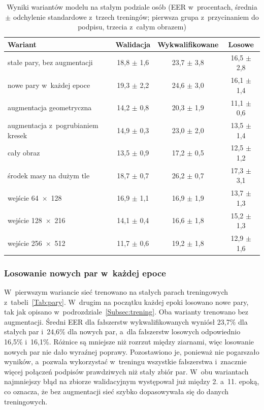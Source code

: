 \documentclass[12pt, twoside, openright]{article}
\begin{document}
\begin{table}[ht]
\caption{Wyniki wariantów modelu na stałym podziale osób (EER w~procentach, średnia $\pm$ odchylenie standardowe z~trzech treningów; pierwsza grupa z~przycinaniem do podpisu, trzecia z~całym obrazem)}
\centering
	\begin{tabular}{|l|c|c|c|}
		\hline
		Wariant & Walidacja & Wykwalifikowane & Losowe \\
		\hline
		stałe pary, bez augmentacji & 18,8 $\pm$ 1,6 & 23,7 $\pm$ 3,8 & 16,5 $\pm$ 2,8 \\
		nowe pary w~każdej epoce & 19,3 $\pm$ 2,2 & 24,6 $\pm$ 3,0 & 16,1 $\pm$ 1,4 \\
		augmentacja geometryczna & 14,2 $\pm$ 0,8 & 20,3 $\pm$ 1,9 & 11,1 $\pm$ 0,6 \\
		augmentacja z~pogrubianiem kresek & 14,9 $\pm$ 0,3 & 23,0 $\pm$ 2,0 & 13,5 $\pm$ 1,4 \\
		\hline
		cały obraz & 13,5 $\pm$ 0,9 & 17,2 $\pm$ 0,5 & 12,5 $\pm$ 1,2 \\
		środek masy na dużym tle & 18,7 $\pm$ 0,7 & 26,2 $\pm$ 0,7 & 17,3 $\pm$ 3,1 \\
		\hline
		wejście 64~$\times$~128 & 16,9 $\pm$ 1,1 & 16,9 $\pm$ 1,9 & 13,7 $\pm$ 1,3 \\
		wejście 128~$\times$~216 & 14,1 $\pm$ 0,4 & 16,6 $\pm$ 1,8 & 15,2 $\pm$ 1,3 \\
		wejście 256~$\times$~512 & 11,7 $\pm$ 0,6 & 19,2 $\pm$ 1,8 & 12,9 $\pm$ 1,6 \\
		\hline
	\end{tabular}
\label{Tab:warianty}
\end{table}

\subsubsection*{Losowanie nowych par w~każdej epoce}

W~pierwszym wariancie sieć trenowano na stałych parach treningowych z~tabeli~\ref{Tab:pary}.
W~drugim na początku każdej epoki losowano nowe pary, tak jak opisano w~podrozdziale~\ref{Subsec:trening}.
Oba warianty trenowano bez augmentacji.
Średni EER dla fałszerstw wykwalifikowanych wyniósł 23,7\% dla stałych par i~24,6\% dla nowych par, a~dla fałszerstw losowych odpowiednio 16,5\% i~16,1\%.
Różnice są mniejsze niż rozrzut między ziarnami, więc losowanie nowych par nie dało wyraźnej poprawy.
Pozostawiono je, ponieważ nie pogarszało wyników, a~pozwala wykorzystać w~treningu wszystkie fałszerstwa i~znacznie więcej połączeń podpisów prawdziwych niż stały zbiór par.
W~obu wariantach najmniejszy błąd na zbiorze walidacyjnym występował już między 2. a~11. epoką, co oznacza, że bez augmentacji sieć szybko dopasowywała się do danych treningowych.
\end{document}
